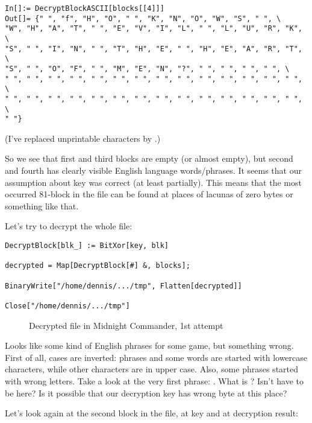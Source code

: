 \begin{lstlisting}
In[]:= DecryptBlockASCII[blocks[[4]]]
Out[]= {" ", "f", "H", "O", " ", "K", "N", "O", "W", "S", " ", \
"W", "H", "A", "T", " ", "E", "V", "I", "L", " ", "L", "U", "R", "K", \
"S", " ", "I", "N", " ", "T", "H", "E", " ", "H", "E", "A", "R", "T", \
"S", " ", "O", "F", " ", "M", "E", "N", "?", " ", " ", " ", " ", \
" ", " ", " ", " ", " ", " ", " ", " ", " ", " ", " ", " ", " ", " ", \
" ", " ", " ", " ", " ", " ", " ", " ", " ", " ", " ", " ", " ", " ", \
" "}
\end{lstlisting}

(I've replaced unprintable characters by \q{?}.)

So we see that first and third blocks are empty (or almost empty), but second and fourth has clearly visible English language words/phrases.
It seems that our assumption about key was correct (at least partially).
This means that the most occurred 81-block in the file can be found at places of lacunas of zero bytes or something like that.

Let's try to decrypt the whole file:

\begin{lstlisting}
DecryptBlock[blk_] := BitXor[key, blk]

decrypted = Map[DecryptBlock[#] &, blocks];

BinaryWrite["/home/dennis/.../tmp", Flatten[decrypted]]

Close["/home/dennis/.../tmp"]
\end{lstlisting}

\begin{figure}[H]
\centering
{}
\caption{Decrypted file in Midnight Commander, 1st attempt}
\end{figure}

Looks like some kind of English phrases for some game, but something wrong.
First of all, cases are inverted: phrases and some words are started with lowercase characters, while other characters are in upper case.
Also, some phrases started with wrong letters.
Take a look at the very first phrase: .
What is ? Isn't  have to be here?
Is it possible that our decryption key has wrong byte at this place?

Let's look again at the second block in the file, at key and at decryption result:

